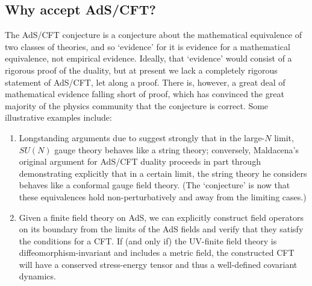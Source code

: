 \documentclass[12pt]{article}
\begin{document}
\subsection{Why accept AdS/CFT?}

The AdS/CFT conjecture is a conjecture about the mathematical equivalence of two classes of theories, and so `evidence' for it is evidence for a mathematical equivalence, not empirical evidence. Ideally, that `evidence' would consist of a rigorous proof of the duality, but at present we lack a completely rigorous statement of AdS/CFT, let along a proof. There is, however, a great deal of mathematical evidence falling short of proof, which has convinced the great majority of the physics community that the conjecture is correct.  Some illustrative examples include:
\begin{enumerate}
\item Longstanding arguments due to  suggest strongly that in the large-$N$ limit, $SU(N)$ gauge theory behaves like a string theory; conversely, Maldacena's original argument for AdS/CFT duality proceeds in part through demonstrating explicitly that in a certain limit, the string theory he considers behaves like a conformal gauge field theory. (The `conjecture' is now that these equivalences hold non-perturbatively and away from the limiting cases.)
\item Given a finite field theory on AdS, we can explicitly construct field operators on its boundary from the limits of the AdS fields and verify that they satisfy the conditions for a CFT. If (and only if) the UV-finite field theory is diffeomorphism-invariant and includes a metric field, the constructed CFT will have a conserved stress-energy tensor and thus a well-defined covariant dynamics. 


\end{enumerate}
\end{document}
